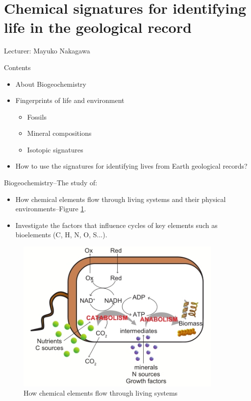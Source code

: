 \documentclass[]{article}
\begin{document}
\section{Chemical signatures for identifying life in the geological record}

Lecturer: Mayuko Nakagawa

Contents
\begin{itemize}
	\item About Biogeochemistry
	\item Fingerprints of life and environment
	\begin{itemize}
		\item Fossils
		\item Mineral compositions
		\item Isotopic signatures
	\end{itemize}
	\item How to use the signatures for identifying lives from 	Earth geological records?
\end{itemize}

Biogeochemistry--The study of:
\begin{itemize}
	\item How chemical elements flow through living systems and their physical environments--Figure \ref{fig:Biogeochemistry}\cite{linares-pasten_2018}.
	\item Investigate the factors that influence cycles of key 	elements such as bioelements (C, H, N, O, S...).
	
\end{itemize}

\begin{figure}[H]
	\caption{How chemical elements flow through living systems}\label{fig:Biogeochemistry}
	\includegraphics[width=0.9\textwidth]{Biogeochemistry}
\end{figure}
\end{document}
